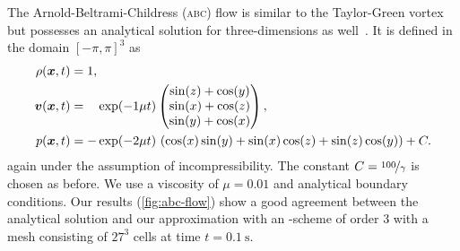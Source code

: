 \documentclass[runningheads]{llncs}
\begin{document}
The Arnold-Beltrami-Childress (\textsc{abc}) flow is similar to the Taylor-Green vortex but possesses an analytical solution for three-dimensions as well~\cite{tavelli2016staggered}.
It is defined in the domain \( \left[ -\pi, \pi \right]^3 \) as
\begin{align}
  \label{eq:abc-flow}
  \begin{split}
  \rho(\bm{x}, t) &= 1,\\
  \bm{v}(\bm{x}, t) &= \phantom{-} \exp(-1\mu t)
  \begin{pmatrix}
    \sin(z) + \cos(y)\\
    \sin(x) + \cos(z)\\
    \sin(y) + \cos(x)
  \end{pmatrix}, \\
  p(\bm{x}, t) &= -\exp(-2 \mu t) \, \left(\cos(x)\sin(y) + \sin(x)\cos(z) + \sin(z)\cos(y)\right)
  + C.
  \end{split}
\end{align}
again under the assumption of incompressibility.
The constant $C = \nicefrac{100}{\gamma}$ is chosen as before.
We use a viscosity of $\mu = 0.01$ and analytical boundary conditions.
Our results (\cref{fig:abc-flow}) show a good agreement between the analytical solution and our approximation with an \aderdg{}-scheme of order $3$ with a mesh consisting of $27^3$ cells at time $t = \SI{0.1}{\s}$.
\end{document}
